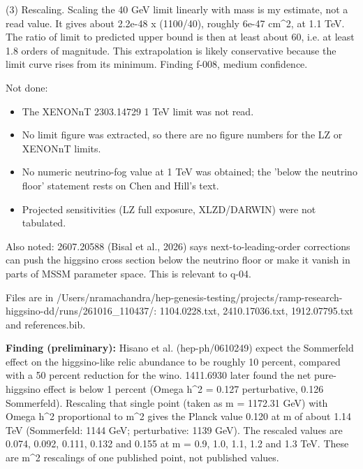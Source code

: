 \documentclass[11pt,a4paper]{article}
\begin{document}
(3) Rescaling. Scaling the 40 GeV limit linearly with mass is my estimate, not a read value. It gives about 2.2e-48 x (1100/40), roughly 6e-47 cm\textasciicircum{}2, at 1.1 TeV. The ratio of limit to predicted upper bound is then at least about 60, i.e. at least 1.8 orders of magnitude. This extrapolation is likely conservative because the limit curve rises from its minimum. Finding f-008, medium confidence.

Not done:

\begin{itemize}
  \item The XENONnT 2303.14729 1 TeV limit was not read.
  \item No limit figure was extracted, so there are no figure numbers for the LZ or XENONnT limits.
  \item No numeric neutrino-fog value at 1 TeV was obtained; the 'below the neutrino floor' statement rests on Chen and Hill's text.
  \item Projected sensitivities (LZ full exposure, XLZD/DARWIN) were not tabulated.
\end{itemize}
Also noted: 2607.20588 (Bisal et al., 2026) says next-to-leading-order corrections can push the higgsino cross section below the neutrino floor or make it vanish in parts of MSSM parameter space. This is relevant to q-04.

Files are in /Users/nramachandra/hep-genesis-testing/projects/ramp-research-higgsino-dd/runs/261016\_110437/: 1104.0228.txt, 2410.17036.txt, 1912.07795.txt and references.bib.

\textbf{Finding (preliminary):} Hisano et al. (hep-ph/0610249) expect the Sommerfeld effect on the higgsino-like relic abundance to be roughly 10 percent, compared with a 50 percent reduction for the wino. 1411.6930 later found the net pure-higgsino effect is below 1 percent (Omega h\textasciicircum{}2 = 0.127 perturbative, 0.126 Sommerfeld). Rescaling that single point (taken as m = 1172.31 GeV) with Omega h\textasciicircum{}2 proportional to m\textasciicircum{}2 gives the Planck value 0.120 at m of about 1.14 TeV (Sommerfeld: 1144 GeV; perturbative: 1139 GeV). The rescaled values are 0.074, 0.092, 0.111, 0.132 and 0.155 at m = 0.9, 1.0, 1.1, 1.2 and 1.3 TeV. These are m\textasciicircum{}2 rescalings of one published point, not published values.
\end{document}
